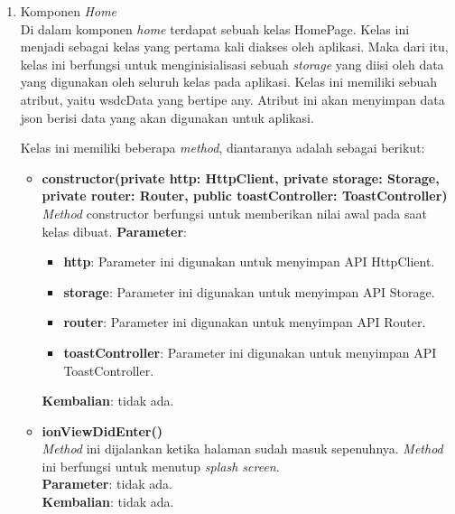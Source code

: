 \begin{enumerate}
	\item Komponen \textit{Home} \\
	Di dalam komponen \textit{home} terdapat sebuah kelas HomePage. Kelas ini menjadi sebagai kelas yang pertama kali diakses oleh aplikasi. Maka dari itu, kelas ini berfungsi untuk menginisialisasi sebuah \textit{storage} yang diisi oleh data yang digunakan oleh seluruh kelas pada aplikasi. Kelas ini memiliki sebuah atribut, yaitu wsdcData yang bertipe any. Atribut ini akan menyimpan data json berisi data yang akan digunakan untuk aplikasi. 
	
	Kelas ini memiliki beberapa \textit{method}, diantaranya adalah sebagai berikut:
	
	\begin{itemize}
		\item \textbf{constructor(private http: HttpClient, private storage: Storage, private router: Router, public toastController: ToastController)} \\
			\textit{Method} constructor berfungsi untuk memberikan nilai awal pada saat kelas dibuat.
			\textbf{Parameter}:
			\begin{itemize}
				\item \textbf{http}: Parameter ini digunakan untuk menyimpan API HttpClient.
				\item \textbf{storage}: Parameter ini digunakan untuk menyimpan API Storage.
				\item \textbf{router}: Parameter ini digunakan untuk menyimpan API Router.
				\item \textbf{toastController}: Parameter ini digunakan untuk menyimpan API ToastController.
			\end{itemize}
			\textbf{Kembalian}: tidak ada.
		
		\item \textbf{ionViewDidEnter()}\\
			\textit{Method} ini dijalankan ketika halaman sudah masuk sepenuhnya. \textit{Method} ini berfungsi untuk menutup \textit{splash screen}. \\
			\textbf{Parameter}: tidak ada. \\
			\textbf{Kembalian}: tidak ada.
			

\end{itemize}
\end{enumerate}

